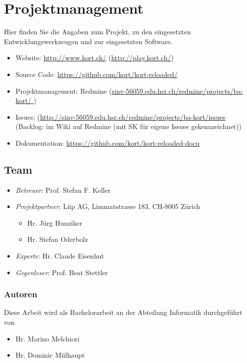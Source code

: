 \chapter{Projektmanagement}
\label{pm-projektmanagement}
Hier finden Sie die Angaben zum Projekt, zu den eingesetzten Entwicklungswerkzeugen und zur eingesetzten Software.

\begin{itemize}
    \item Website: \url{http://www.kort.ch/} (\url{http://play.kort.ch/})
    \item Source Code: \url{https://github.com/kort/kort-reloaded/}
    \item Projektmanagement: Redmine (\url{sinv-56059.edu.hsr.ch/redmine/projects/ba-kort/ })
    \item Issues: (\url{http://sinv-56059.edu.hsr.ch/redmine/projects/ba-kort/issues}  (Backlog: im Wiki auf Redmine (mit SK für eigene Issues gekennzeichnet)) 
    \item Dokumentation: \url{https://github.com/kort/kort-reloaded-docu}
\end{itemize}

\section{Team}
\label{pm-team}
\begin{itemize}
	\item \textit{Betreuer}: Prof. Stefan F. Keller
	\item \textit{Projektpartner}: Liip AG, Limmatstrasse 183, CH-8005 Zürich
	\begin{itemize}
		\item Hr. Jürg Hunziker
		\item Hr. Stefan Oderbolz
	\end{itemize}
	\item \textit{Experte}: Hr. Claude Eisenhut
	\item \textit{Gegenleser}: Prof. Beat Stettler
\end{itemize}

\subsection*{Autoren}
Diese Arbeit wird als Bachelorarbeit an der Abteilung Informatik durchgeführt von
\begin{itemize}
	\item Hr. Marino Melchiori
	\item Hr. Dominic Mülhaupt
\end{itemize}


